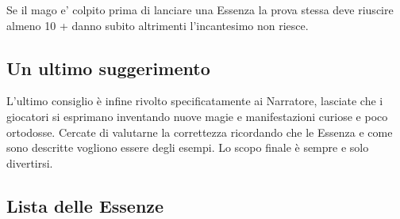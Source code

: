 \documentclass[a4paper,11pt,twoside,openany]{book}
\begin{document}
Se il mago e' colpito prima di lanciare una Essenza la prova stessa deve riuscire almeno 10 + danno subito altrimenti l'incantesimo non riesce.

\subsection{Un ultimo suggerimento}

L'ultimo consiglio è infine rivolto specificatamente ai Narratore, lasciate che i giocatori si esprimano inventando nuove magie e manifestazioni curiose e poco ortodosse. Cercate di valutarne la correttezza ricordando che le Essenza e come sono descritte vogliono essere degli esempi. Lo scopo finale è sempre e solo divertirsi.

\subsection{Lista delle Essenze}
\end{document}
